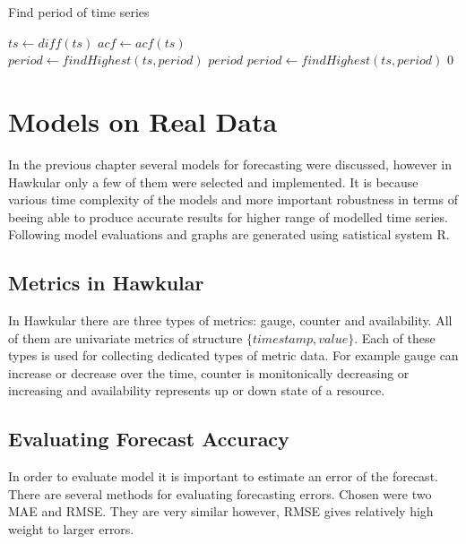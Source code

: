     \begin{algorithm}
        \caption{Find period of time series} \label{alg:period-find}
        \begin{algorithmic}[1]
             
                \State $ts \gets diff(ts)$ 
            \EndIf
            \State $acf \gets acf(ts)$ \\
            \State $period \gets findHighest(ts, period)$
                    \State \Return $period$
                \EndIf
                $period \gets findHighest(ts, period)$
            \EndWhile
            \State \Return $0$
        \EndFunction
        \end{algorithmic}
    \end{algorithm}

\chapter{Models on Real Data}
In the previous chapter several models for forecasting were discussed, however in Hawkular only a few of them were
selected and implemented. It is because various time complexity of the models and more important robustness in terms of
beeing able to produce accurate results for higher range of modelled time series.
Following model evaluations and graphs are generated using satistical system R.

    \section{Metrics in Hawkular}
    In Hawkular there are three types of metrics: gauge, counter and availability. All of them are univariate metrics
    of structure $ \{timestamp, value\} $. Each of these types is used for collecting dedicated types of metric data.
    For example gauge can increase or decrease over the time, counter is monitonically decreasing or increasing and
    availability represents up or down state of a resource.

    \section{Evaluating Forecast Accuracy}
    In order to evaluate model it is important to estimate an error of the forecast. There are 
    several methods for evaluating forecasting errors. Chosen were two MAE and RMSE. They are 
    very similar however, RMSE gives relatively high weight to larger errors.

